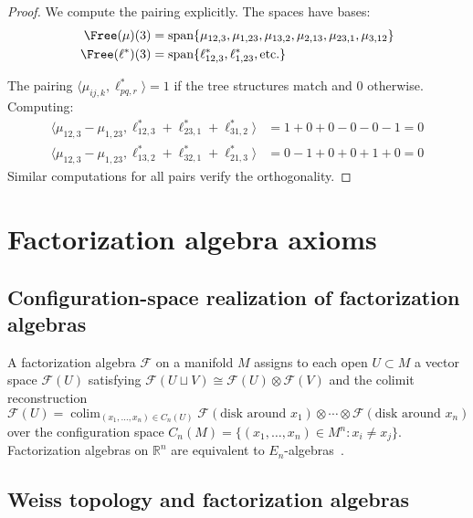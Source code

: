 \begin{proof}
We compute the pairing explicitly. The spaces have bases:
\begin{align}
\Free(\mu)(3) &= \text{span}\{\mu_{12,3}, \mu_{1,23}, \mu_{13,2}, \mu_{2,13}, \mu_{23,1}, \mu_{3,12}\} \\
\Free(\ell^*)(3) &= \text{span}\{\ell^*_{12,3}, \ell^*_{1,23}, \text{etc.}\}
\end{align}

The pairing $\langle \mu_{ij,k}, \ell^*_{pq,r} \rangle = 1$ if the tree structures match and $0$ otherwise. Computing:
\begin{align}
\langle \mu_{12,3} - \mu_{1,23}, \ell^*_{12,3} + \ell^*_{23,1} + \ell^*_{31,2} \rangle &= 1 + 0 + 0 - 0 - 0 - 1 = 0 \\
\langle \mu_{12,3} - \mu_{1,23}, \ell^*_{13,2} + \ell^*_{32,1} + \ell^*_{21,3} \rangle &= 0 - 1 + 0 + 0 + 1 + 0 = 0
\end{align}
Similar computations for all pairs verify the orthogonality.
\end{proof}

\section{Factorization algebra axioms}
\label{sec:factorization-axioms-complete}

\subsection{Configuration-space realization of factorization algebras}

\begin{construction}
A factorization algebra $\mathcal{F}$ on a manifold $M$ assigns to each open $U \subset M$ a vector space $\mathcal{F}(U)$ satisfying
$\mathcal{F}(U \sqcup V) \cong \mathcal{F}(U) \otimes \mathcal{F}(V)$
and the colimit reconstruction
\[\mathcal{F}(U)= \operatorname{colim}_{(x_1,\ldots,x_n) \in C_n(U)}
 \mathcal{F}(\text{disk around } x_1) \otimes \cdots \otimes
 \mathcal{F}(\text{disk around } x_n)\]
over the configuration space $C_n(M) = \{(x_1, \ldots, x_n) \in M^n : x_i \neq x_j\}$.
Factorization algebras on $\mathbb{R}^n$ are
equivalent to $E_n$-algebras~\cite[Theorem~5.4.5.9]{HA}.
\end{construction}

\subsection{Weiss topology and factorization algebras}

